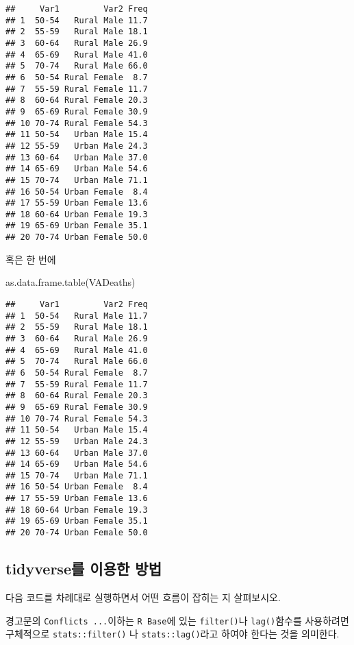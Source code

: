 \documentclass[
]{article}
\newenvironment{Shaded}{\begin{snugshade}}{\end{snugshade}}
\newcommand{\FunctionTok}[1]{\textcolor[rgb]{0.00,0.00,0.00}{#1}}
\newcommand{\NormalTok}[1]{#1}
\begin{document}
\begin{verbatim}
##     Var1         Var2 Freq
## 1  50-54   Rural Male 11.7
## 2  55-59   Rural Male 18.1
## 3  60-64   Rural Male 26.9
## 4  65-69   Rural Male 41.0
## 5  70-74   Rural Male 66.0
## 6  50-54 Rural Female  8.7
## 7  55-59 Rural Female 11.7
## 8  60-64 Rural Female 20.3
## 9  65-69 Rural Female 30.9
## 10 70-74 Rural Female 54.3
## 11 50-54   Urban Male 15.4
## 12 55-59   Urban Male 24.3
## 13 60-64   Urban Male 37.0
## 14 65-69   Urban Male 54.6
## 15 70-74   Urban Male 71.1
## 16 50-54 Urban Female  8.4
## 17 55-59 Urban Female 13.6
## 18 60-64 Urban Female 19.3
## 19 65-69 Urban Female 35.1
## 20 70-74 Urban Female 50.0
\end{verbatim}

혹은 한 번에

\begin{Shaded}
\begin{Highlighting}[]
\FunctionTok{as.data.frame.table}\NormalTok{(VADeaths)}
\end{Highlighting}
\end{Shaded}

\begin{verbatim}
##     Var1         Var2 Freq
## 1  50-54   Rural Male 11.7
## 2  55-59   Rural Male 18.1
## 3  60-64   Rural Male 26.9
## 4  65-69   Rural Male 41.0
## 5  70-74   Rural Male 66.0
## 6  50-54 Rural Female  8.7
## 7  55-59 Rural Female 11.7
## 8  60-64 Rural Female 20.3
## 9  65-69 Rural Female 30.9
## 10 70-74 Rural Female 54.3
## 11 50-54   Urban Male 15.4
## 12 55-59   Urban Male 24.3
## 13 60-64   Urban Male 37.0
## 14 65-69   Urban Male 54.6
## 15 70-74   Urban Male 71.1
## 16 50-54 Urban Female  8.4
## 17 55-59 Urban Female 13.6
## 18 60-64 Urban Female 19.3
## 19 65-69 Urban Female 35.1
## 20 70-74 Urban Female 50.0
\end{verbatim}

\hypertarget{tidyverseuxb97c-uxc774uxc6a9uxd55c-uxbc29uxbc95}{%
\subsection{tidyverse를 이용한
방법}\label{tidyverseuxb97c-uxc774uxc6a9uxd55c-uxbc29uxbc95}}

다음 코드를 차례대로 실행하면서 어떤 흐름이 잡히는 지 살펴보시오.

경고문의 \texttt{Conflicts\ ...}이하는 \texttt{R\ Base}에 있는
\texttt{filter()}나 \texttt{lag()}함수를 사용하려면 구체적으로
\texttt{stats::filter()} 나 \texttt{stats::lag()}라고 하여야 한다는 것을
의미한다.
\end{document}
